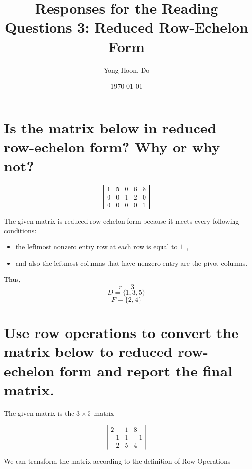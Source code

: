 \documentclass{article}
\title{Responses for the Reading Questions 3: Reduced Row-Echelon Form}
\author{Yong Hoon, Do}
\date{\today}
\begin{document}
\maketitle



\section{Is the matrix below in reduced row-echelon form? Why or why not?}

\[ \left| \begin{array}{cccccc}
1 & 5 & 0 & 6 & 8 \\
0 & 0 & 1 & 2 & 0  \\
0 & 0 & 0 & 0 & 1
\end{array} \right|\]

The given matrix is reduced row-echelon form because it meets every following conditions:

\begin{itemize}
    \item the leftmost nonzero entry row at each row is equal to $1$~,
    \item and also the leftmost columns that have nonzero entry are the pivot columns.
\end{itemize}

Thus,
\[r=3\]
\[D=\{1,3,5\}\]
\[F=\{2,4\}\]


\section{Use row operations to convert the matrix below to reduced row-echelon form and report the final matrix.}

The given matrix is the $3 \times 3$~matrix

\[
\left| \begin{array}{ccc}
2 & 1 & 8 \\
-1 & 1 & -1  \\
-2 & 5 & 4
\end{array} \right|
\]

\bigskip

We can transform the matrix according to the definition of Row Operations
\end{document}
